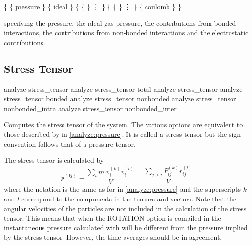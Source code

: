 
\begin{code}
\{ \{ pressure  \}
   \{ ideal  \} 
   \{ \{   \}
      \vdots
   \}
   \{ \{   \}
      \vdots
   \}
   \{ coulomb  \}
\}
\end{code}
specifying the pressure, the ideal gas pressure, the
contributions from bonded interactions, the contributions from
non-bonded interactions and the electrostatic contributions.


\subsection{Stress Tensor}
\label{analyze:stress_tensor}

\begin{essyntax}
   analyze stress_tensor
   analyze stress_tensor total
   analyze stress_tensor 
   analyze stress_tensor bonded 
   analyze stress_tensor nonbonded  
   analyze stress_tensor nonbonded_intra 
   analyze stress_tensor nonbonded_inter 
\end{essyntax}

Computes the stress tensor of the system.  The various options are equivalent to those described by
 in \vref{analyze:pressure}. It is called a stress tensor but the sign
convention follows that of a pressure tensor.

The stress tensor is calculated by 
\begin{equation}
  p^{(kl)} = \frac{\sum_{i} {m_{i}v_{i}^{(k)}v_{i}^{(l)}}}{V} + \frac{\sum_{j>i}{F_{ij}^{(k)}r_{ij}^{(l)}}}{V}
\end{equation}
where the notation is the same as for  in \vref{analyze:pressure} and the
superscripts $k$ and $l$ correspond to the components in the tensors and vectors.  Note that the
angular velocities of the particles are not included in the calculation of the stress tensor.  This
means that when the ROTATION option is compiled in the instantaneous pressure calculated with
 will be different from the pressure implied by
the stress tensor.  However, the time averages should be in agreement.

